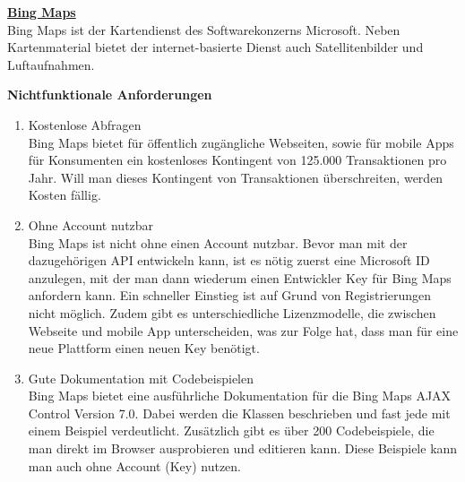 \textbf{\underline{Bing Maps}}\\
Bing Maps ist der Kartendienst des Softwarekonzerns Microsoft. Neben Kartenmaterial bietet der internet-basierte Dienst auch Satellitenbilder und Luftaufnahmen.

\textbf{Nichtfunktionale Anforderungen}
\begin{enumerate}
\item Kostenlose Abfragen \\
Bing Maps bietet für öffentlich zugängliche Webseiten, sowie für mobile Apps für Konsumenten ein kostenloses Kontingent von 125.000 Transaktionen pro Jahr. Will man dieses Kontingent von Transaktionen überschreiten, werden Kosten fällig.
\cite{microsoft}

\item Ohne Account nutzbar\\

Bing Maps ist nicht ohne einen Account nutzbar. Bevor man mit der dazugehörigen API entwickeln kann, ist es nötig zuerst eine Microsoft ID anzulegen, mit der man dann wiederum einen Entwickler Key für Bing Maps anfordern kann. Ein schneller Einstieg ist auf Grund von Registrierungen nicht möglich. Zudem gibt es unterschiedliche Lizenzmodelle, die zwischen Webseite und mobile App unterscheiden, was zur Folge hat, dass man für eine neue Plattform einen neuen Key benötigt. \cite{gruber2015} \cite{microsoft}

\item Gute Dokumentation mit Codebeispielen\\
Bing Maps bietet eine ausführliche Dokumentation für die Bing Maps AJAX Control Version 7.0. Dabei werden die Klassen beschrieben und fast jede mit einem Beispiel verdeutlicht. 
Zusätzlich gibt es über 200 Codebeispiele, die man direkt im Browser ausprobieren und editieren kann. Diese Beispiele kann man auch ohne Account (Key) nutzen.

\end{enumerate}



